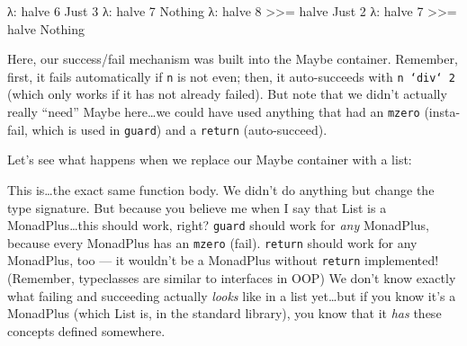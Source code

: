 \documentclass[]{article}
\newenvironment{Shaded}{}{}
\newcommand{\KeywordTok}[1]{\textcolor[rgb]{0.00,0.44,0.13}{\textbf{{#1}}}}
\newcommand{\DataTypeTok}[1]{\textcolor[rgb]{0.56,0.13,0.00}{{#1}}}
\newcommand{\DecValTok}[1]{\textcolor[rgb]{0.25,0.63,0.44}{{#1}}}
\newcommand{\OtherTok}[1]{\textcolor[rgb]{0.00,0.44,0.13}{{#1}}}
\newcommand{\FunctionTok}[1]{\textcolor[rgb]{0.02,0.16,0.49}{{#1}}}
\newcommand{\NormalTok}[1]{{#1}}
\begin{document}
\begin{Shaded}
\begin{Highlighting}[]
\NormalTok{λ}\FunctionTok{:} \NormalTok{halve }\DecValTok{6}
\DataTypeTok{Just} \DecValTok{3}
\NormalTok{λ}\FunctionTok{:} \NormalTok{halve }\DecValTok{7}
\DataTypeTok{Nothing}
\NormalTok{λ}\FunctionTok{:} \NormalTok{halve }\DecValTok{8} \FunctionTok{>>=} \NormalTok{halve}
\DataTypeTok{Just} \DecValTok{2}
\NormalTok{λ}\FunctionTok{:} \NormalTok{halve }\DecValTok{7} \FunctionTok{>>=} \NormalTok{halve}
\DataTypeTok{Nothing}
\end{Highlighting}
\end{Shaded}

Here, our success/fail mechanism was built into the Maybe container.
Remember, first, it fails automatically if \texttt{n} is not even; then,
it auto-succeeds with \texttt{n\ `div`\ 2} (which only works if it has
not already failed). But note that we didn't actually really ``need''
Maybe here\ldots{}we could have used anything that had an \texttt{mzero}
(insta-fail, which is used in \texttt{guard}) and a \texttt{return}
(auto-succeed).

Let's see what happens when we replace our Maybe container with a list:

\begin{Shaded}
\end{Shaded}

This is\ldots{}the exact same function body. We didn't do anything but
change the type signature. But because you believe me when I say that
List is a MonadPlus\ldots{}this should work, right? \texttt{guard}
should work for \emph{any} MonadPlus, because every MonadPlus has an
\texttt{mzero} (fail). \texttt{return} should work for any MonadPlus,
too --- it wouldn't be a MonadPlus without \texttt{return} implemented!
(Remember, typeclasses are similar to interfaces in OOP) We don't know
exactly what failing and succeeding actually \emph{looks} like in a list
yet\ldots{}but if you know it's a MonadPlus (which List is, in the
standard library), you know that it \emph{has} these concepts defined
somewhere.
\end{document}
